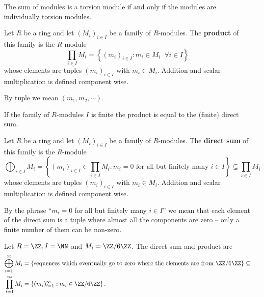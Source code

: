 \documentclass[12pt, a4paper]{article}
\begin{document}
\begin{proposition}
    The sum of modules is a torsion module if and only if the modules are individually torsion modules.
\end{proposition}

\begin{definition}
    Let \(R\) be a ring and let \((M_i)_{i \in I}\) be a family of \(R\)-modules. The \textbf{product} of this family is the \(R\)-module
    \[\prod_{i \in I} M_i = \left\{ (m_i)_{i \in I} : m_i\in M_i \;\; \forall i\in I \right\}\]
    whose elements are tuples \((m_i)_{i \in I}\) with \(m_i \in M_i\). Addition and scalar multiplication is defined component wise.
\end{definition}

\begin{mdnote}
    By tuple we mean \((m_1,m_2,\cdots)\).
\end{mdnote}

\begin{mdremark}
    If the family of \(R\)-modules \(I\) is finite the product is equal to the (finite) direct sum.
\end{mdremark}

\begin{definition}
    Let \(R\) be a ring and let \((M_i)_{i \in I}\) be a family of \(R\)-modules. The \textbf{direct sum} of this family is the \(R\)-module
    \[\bigoplus_{i \in I} M_i = \left\{ (m_i)_{i \in I} \in \prod_{i \in I} M_i : m_i=0 \text{ for all but finitely many } i \in I \right\} \subseteq \prod_{i \in I} M_i\]
    whose elements are tuples \((m_i)_{i \in I}\) with \(m_i \in M_i\). Addition and scalar multiplication is defined component wise.
\end{definition}

\begin{mdnote}
    By the phrase ``\(m_i=0\) for all but finitely many \(i \in I\)'' we mean that each element of the direct sum is a tuple where almost all the components are zero -- only a finite number of them can be non-zero.
\end{mdnote}

\begin{example}
    Let \(R =\ZZ, I=\NN\) and \(M_i = \ZZ/6\ZZ\). The direct sum and product are 
    \[\begin{aligned}
        \bigoplus_{i=1}^{\infty} M_i &= \left\{\text{sequences which eventually go to zero where the elements are from } \ZZ/6\ZZ \right\} \subseteq \\
        \prod_{i=1}^{\infty} M_i &= \left\{ (m_i)_{i=1}^{\infty} : m_i \in \ZZ/6\ZZ \right\}.
    \end{aligned}\]
\end{example}
\end{document}
